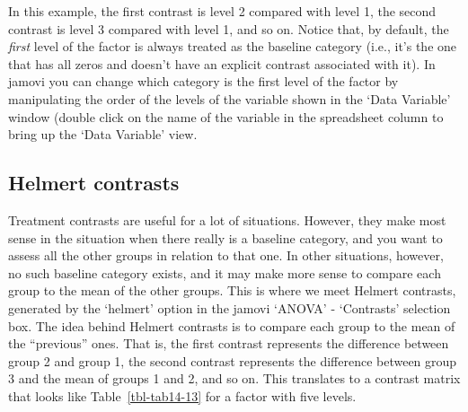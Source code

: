 \documentclass[
  a4paper,
]{book}
\begin{document}
In this example, the first contrast is level 2 compared with level 1,
the second contrast is level 3 compared with level 1, and so on. Notice
that, by default, the \emph{first} level of the factor is always treated
as the baseline category (i.e., it's the one that has all zeros and
doesn't have an explicit contrast associated with it). In jamovi you can
change which category is the first level of the factor by manipulating
the order of the levels of the variable shown in the `Data Variable'
window (double click on the name of the variable in the spreadsheet
column to bring up the `Data Variable' view.

\hypertarget{helmert-contrasts}{%
\subsection{Helmert contrasts}\label{helmert-contrasts}}

Treatment contrasts are useful for a lot of situations. However, they
make most sense in the situation when there really is a baseline
category, and you want to assess all the other groups in relation to
that one. In other situations, however, no such baseline category
exists, and it may make more sense to compare each group to the mean of
the other groups. This is where we meet Helmert contrasts, generated by
the `helmert' option in the jamovi `ANOVA' - `Contrasts' selection box.
The idea behind Helmert contrasts is to compare each group to the mean
of the ``previous'' ones. That is, the first contrast represents the
difference between group 2 and group 1, the second contrast represents
the difference between group 3 and the mean of groups 1 and 2, and so
on. This translates to a contrast matrix that looks like
Table~\ref{tbl-tab14-13} for a factor with five levels.

\hypertarget{tbl-tab14-13}{}
 
  \providecommand{\huxb}[2]{\arrayrulecolor[RGB]{#1}\global\arrayrulewidth=#2pt}
  \providecommand{\huxvb}[2]{\color[RGB]{#1}\vrule width #2pt}
  \providecommand{\huxtpad}[1]{\rule{0pt}{#1}}
  \providecommand{\huxbpad}[1]{\rule[-#1]{0pt}{#1}}
\end{document}
